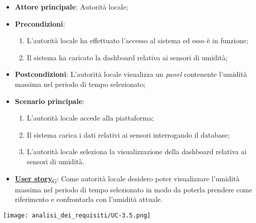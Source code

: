 \begin{itemize}
	\item \textbf{Attore principale}: Autorità locale;
	\item \textbf{Precondizioni}:
	      \begin{enumerate}
		      \item L'autorità locale ha effettuato l'accesso al sistema ed esso è in funzione;
		      \item Il sistema ha caricato la dashboard relativa ai sensori di umidità;
	      \end{enumerate}
	\item \textbf{Postcondizioni}: L'autorità locale visualizza un \textit{panel} contenente l'umidità massima nel periodo di tempo selezionato;
	\item \textbf{Scenario principale}:
	      \begin{enumerate}
		      \item L'autorità locale accede alla piattaforma;
		      \item Il sistema carica i dati relativi ai sensori interrogando il database;
		      \item L'autorità locale seleziona la visualizzazione della dashboard relativa ai sensori di umidità.
	      \end{enumerate}
	\item \href{https://7last.github.io/docs/rtb/documentazione-interna/glossario\#user-story}{\textbf{User story}\textsubscript{G}}:
	      Come autorità locale desidero poter visualizzare l'umidità massima nel periodo di tempo selezionato
	      in modo da poterla prendere come riferimento e confrontarla con l'umidità attuale.
\end{itemize}
\begin{center}
	\texttt{[image: analisi\_dei\_requisiti/UC-3.5.png]}
\end{center}


